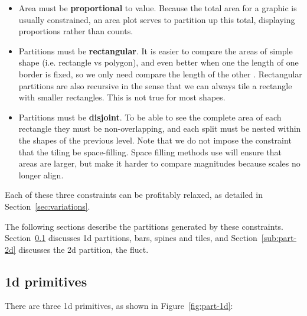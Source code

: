 \documentclass[letterpaper,oneside]{scrartcl}
\begin{document}
\begin{itemize}
  \item Area must be {\bf proportional} to value. Because the total area for a graphic is usually constrained, an area plot serves to partition up this total, displaying proportions rather than counts.

  \item Partitions must be {\bf rectangular}. It is easier to compare the areas of simple shape (i.e. rectangle vs polygon), and even better when one the length of one border is fixed, so we only need compare the length of the other \citep{cleveland:1984}. Rectangular partitions are also recursive in the sense that we can always tile a rectangle with smaller rectangles. This is not true for most shapes.

  \item Partitions must be {\bf disjoint}. To be able to see the complete area of each rectangle they must be non-overlapping, and each split must be nested within the shapes of the previous level. Note that we do not impose the constraint that the tiling be space-filling. Space filling methods use will ensure that areas are larger, but make it harder to compare magnitudes because scales no longer align.

\end{itemize}

\noindent Each of these three constraints can be profitably relaxed, as detailed in Section~\ref{sec:variations}.

The following sections describe the partitions generated by these constraints. Section~\ref{sub:part-1d} discusses 1d partitions, bars, spines and tiles, and  Section~\ref{sub:part-2d} discusses the 2d partition, the fluct.


\subsection{1d primitives}
\label{sub:part-1d}

There are three 1d primitives, as shown in Figure~\ref{fig:part-1d}:
\end{document}
